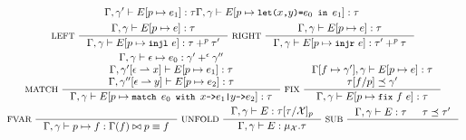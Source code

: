 \begin{figure}
\begin{gather*}
{      \Gamma, \gamma' \judges \upd{ E }{ p }{ e_1 } : \tau }{
      \Gamma, \gamma \judges \upd{E}{p}{ \letexp{x}{y}{e_0}{e_1} } : %
      \tau } \\
    \inference[ LEFT ]{
      \Gamma, \gamma \judges \upd{E}{p}{ e } : \tau }{
      \Gamma, \gamma \judges \upd{E}{p}{ \injl\ e} : %
      \tau +^p \tau' } 
    \inference[ RIGHT ]{
      \Gamma, \gamma \judges \upd{E}{p}{ e } : \tau }{
      \Gamma, \gamma \judges \upd{E}{p}{ \injr\ e} : %
      \tau' +^p \tau } \\
    \inference[ MATCH ]{
      \Gamma, \gamma \judges \epsilon \mapsto e_0 : %
      \gamma' +^\epsilon \gamma'' \\
      \Gamma, \rename{ \gamma' }{ \epsilon }{ x } \judges %
      \upd{E}{p}{e_1} : \tau \\
      \Gamma, \rename{ \gamma'' }{ \epsilon }{ y } \judges %
      \upd{E}{p}{e_2} : \tau }{
      \Gamma, \gamma \judges %
      \upd{E}{p}{ \matchexp{e_0}{ x }{e_1}{ y }{e_2} } : \tau } 
    \inference[ FIX ]{
      \upd{ \Gamma }{ f }{ \gamma' }, \gamma \judges %
      \upd{ E }{ p }{ e } : \tau \\
      \replace{ \tau }{ p }{ f } \subtype \gamma' }{ %
      \Gamma, \gamma \judges \upd{ E }{ p }{ \fix{f}{e} }: \tau } \\
    \inference[ FVAR ]{ }{
      \Gamma, \gamma \judges p \mapsto f : %
      \Gamma(f) \joinctr p \equiv f} 
    \inference[ UNFOLD ]{
      \Gamma, \gamma \judges E : %
      \replace{ \tau }{ \mathcal{X} }{ \tau }_p }{ 
      \Gamma, \gamma \judges E : \mu_{\mathcal{X}}. \tau } 
    \inference[ SUB ]{
      \Gamma, \gamma \judges E : \tau &
      \tau \subtype \tau' }{ %
}
\end{gather*}
\end{figure}
